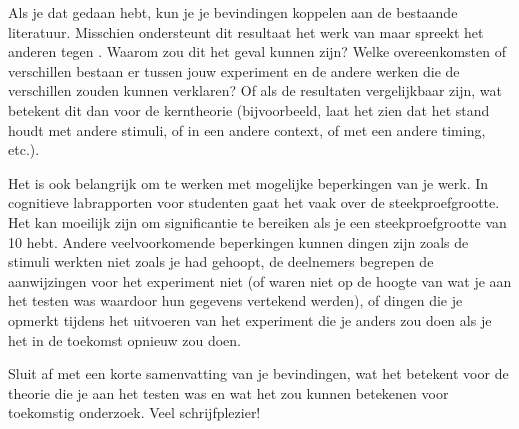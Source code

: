 \documentclass[stu,12pt,floatsintext]{apa7}
\begin{document}
Als je dat gedaan hebt, kun je je bevindingen koppelen aan de bestaande literatuur. Misschien ondersteunt dit resultaat het werk van \textcite{Contributor2023} maar spreekt het anderen tegen \parencite[bv.,][]{Sample2024}.  %
Waarom zou dit het geval kunnen zijn? Welke overeenkomsten of verschillen bestaan er tussen jouw experiment en de andere werken die de verschillen zouden kunnen verklaren? Of als de resultaten vergelijkbaar zijn, wat betekent dit dan voor de kerntheorie (bijvoorbeeld, laat het zien dat het stand houdt met andere stimuli, of in een andere context, of met een andere timing, etc.).

Het is ook belangrijk om te werken met mogelijke beperkingen van je werk. In cognitieve labrapporten voor studenten gaat het vaak over de steekproefgrootte. Het kan moeilijk zijn om significantie te bereiken als je een steekproefgrootte van 10 hebt. Andere veelvoorkomende beperkingen kunnen dingen zijn zoals de stimuli werkten niet zoals je had gehoopt, de deelnemers begrepen de aanwijzingen voor het experiment niet (of waren niet op de hoogte van wat je aan het testen was waardoor hun gegevens vertekend werden), of dingen die je opmerkt tijdens het uitvoeren van het experiment die je anders zou doen als je het in de toekomst opnieuw zou doen.

Sluit af met een korte samenvatting van je bevindingen, wat het betekent voor de theorie die je aan het testen was en wat het zou kunnen betekenen voor toekomstig onderzoek. 
Veel schrijfplezier!

\printbibliography
\end{document}
